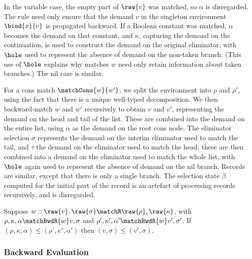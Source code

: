

In the variable case, the empty part of $\raw{v}$ was matched, so $\alpha$ is disregarded. The rule need only ensure that the demand $v$ in the singleton environment $\bind{x}{v}$ is propagated backward. If a Boolean constant was matched, $\alpha$ becomes the demand on that constant, and $\kappa$, capturing the demand on the continuation, is used to construct the demand on the original eliminator, with $\hole$ used to represent the absence of demand on the non-taken branch. (This use of $\hole$ explains why matches $w$ need only retain information about taken branches.) The nil case is similar.

For a cons match $\matchCons{w}{w'}$, we split the environment into $\rho$ and $\rho'$, using the fact that there is a unique well-typed decomposition. We then backward-match $w$ and $w'$ recursively to obtain $v$ and $v'$, representing the demand on the head and tail of the list. These are combined into the demand on the entire list, using $\alpha$ as the demand on the root cons node. The eliminator selection $\sigma$ represents the demand on the interim eliminator used to match the tail, and $\tau$ the demand on the eliminator used to match the head; these are then combined into a demand on the eliminator used to match the whole list, with $\hole$ again used to represent the absence of demand on the nil branch. Records are similar, except that there is only a single branch. The selection state $\beta$ computed for the initial part of the record is an artefact of processing records recursively, and is disregarded.

\begin{lemma}
   Suppose $w :: \raw{v}, \raw{\sigma} \matchR \raw{\rho}, \raw{\kappa}$, with $\rho, \kappa, \alpha \matchBwdR{w} v, \sigma$ and $\rho', \kappa', \alpha' \matchBwdR{w} v', \sigma'$. If $(\rho, \kappa, \alpha) \leq (\rho', \kappa', \alpha')$ then $(v, \sigma) \leq (v', \sigma)$.
\end{lemma}

\subsubsection{Backward Evaluation}
\label{sec:data-dependencies:analyses:bwd:eval}

